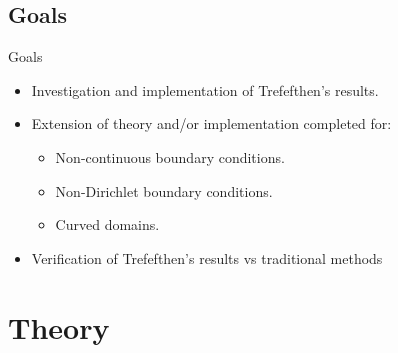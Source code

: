 \documentclass[envcountsect notes]{beamer}       %
\begin{document}
\subsection{Goals}
\begin{frame}{Goals}
        \begin{itemize}
            \item Investigation and implementation of Trefefthen's results.
            \item Extension of theory and/or implementation completed for: 
           \begin{itemize}
                \item Non-continuous boundary conditions.
                \item Non-Dirichlet boundary conditions.
                \item Curved domains. 
            \end{itemize}
            \item Verification of Trefefthen's results vs traditional methods
        \end{itemize} 
\end{frame}


\section{Theory}
\end{document}
